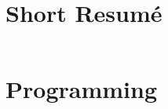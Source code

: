 \documentclass{modernsimplecv}
\newlength{\rightcolwidth}
\newlength{\leftcolwidth}
\begin{document}
\begin{paracol}{2}
{\begin{minipage}[t]{\leftcolwidth}
\vspace{4em}



\end{minipage}

}
\switchcolumn

\begin{minipage}[t]{\rightcolwidth}
\section*{Short Resumé}

\begin{tabular}{r| p{} c}
\end{tabular}

\end{minipage}

\vspace{2em}


\lipsum[10]



\bigskip

\section{Programming} 
{\small
\lipsum[20]

}
\end{paracol}
\end{document}
